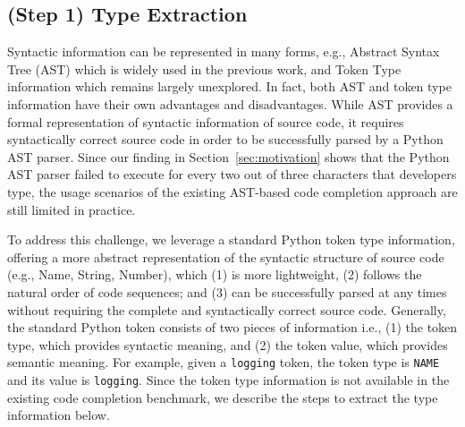 \subsection{(Step 1) Type Extraction}

Syntactic information can be represented in many forms, e.g., Abstract Syntax Tree (AST) which is widely used in the previous work, and Token Type information which remains largely unexplored.
In fact, both AST and token type information have their own advantages and disadvantages.
While AST provides a formal representation of syntactic information of source code, it requires syntactically correct source code in order to be successfully parsed by a Python AST parser.
Since our finding in Section~\ref{sec:motivation} shows that the Python AST parser failed to execute for every two out of three characters that developers type, the usage scenarios of the existing AST-based code completion approach are still limited in practice.

To address this challenge, we leverage a standard Python token type information, offering a more abstract representation of the syntactic structure of source code (e.g., Name, String, Number), which (1) is more lightweight, (2) follows the natural order of code sequences; and (3) can be successfully parsed at any times without requiring the complete and syntactically correct source code.
Generally, the standard Python token consists of two pieces of information i.e., (1) the token type, which provides syntactic meaning, and (2) the token value, which provides semantic meaning.
For example, given a \texttt{logging} token, the token type is \texttt{NAME} and its value is \texttt{logging}.
Since the token type information is not available in the existing code completion benchmark, we describe the steps to extract the type information below.




















